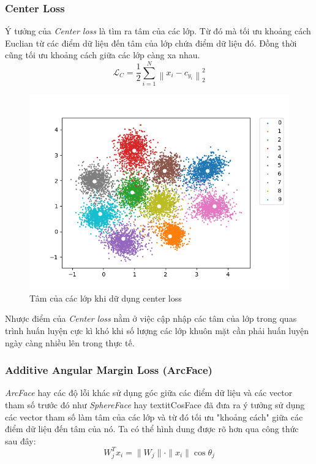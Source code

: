 \documentclass[a4paper, 12pt]{article}
\begin{document}
\subsubsection{Center Loss}
Ý tưởng của \textit{Center loss} là tìm ra tâm của các lớp. Từ đó mà tối ưu khoảng cách Euclian từ các điểm dữ liệu đến tâm của lớp chứa điểm dữ liệu đó. Đồng thời cũng tối ưu khoảng cách giữa các lớp càng xa nhau.  
\begin{equation}
\mathcal{L}_C = \frac{1}{2}\sum_{i=1}^{N}\left\|x_i - c_{y_i}\right\|_2^2
\end{equation}

\begin{figure}[H]
    \begin{center}
        \includegraphics[scale=0.5]{img/center-loss}
        \caption{Tâm của các lớp khi dữ dụng center loss}
    \end{center}
\end{figure}

Nhược điểm của \textit{Center loss} nằm ở việc cập nhập các tâm của lớp trong quas trình huấn luyện cực kì khó khi số lượng các lớp khuôn mặt cần phải huấn luyện ngày càng nhiều lên trong thực tế.

\subsubsection{Additive Angular Margin Loss (ArcFace)}
\textit{ArcFace} hay các độ lỗi khác sử dụng góc giữa các điểm dữ liệu và các vector tham số trước đó như \textit{SphereFace} hay textit{CosFace} đã đưa ra ý tưởng sử dụng các vector tham số làm tâm của các lớp và từ đó tối ưu "khoảng cách" giữa các điểm dữ liệu đến tâm của nó. Ta có thể hình dung được rõ hơn qua công thức sau đây:
\begin{equation}
    W_{j}^{T}x_i = \|W_j\|\cdot\|x_i\|\cos{\theta_j}
\end{equation}
\end{document}
